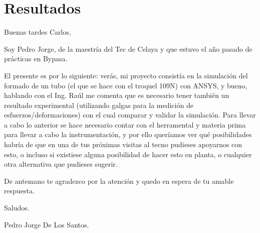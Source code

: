 \chapter{Resultados}

Buenas tardes Carlos, 


Soy Pedro Jorge, de la maestría del Tec de Celaya y que estuvo el año pasado de prácticas en Bypasa. 

El presente es por lo siguiente: verás, mi proyecto consistía en la simulación del formado de un tubo (el que se hace con el troquel 109N) con ANSYS, y bueno, hablando con el Ing. Raúl me comenta que es necesario tener también un resultado experimental (utilizando galgas para la medición de esfuerzos/deformaciones) con el cual comparar y validar la simulación. Para llevar a cabo lo anterior se hace necesario contar con el herramental y materia prima para llevar a cabo la instrumentación, y por ello queríamos ver qué posibilidades habría de que en una de tus próximas visitas al tecno pudieses apoyarnos con esto, o incluso si existiese alguna posibilidad de hacer esto en planta, o cualquier otra alternativa que pudieses sugerir.

De antemano te agradezco por la atención y quedo en espera de tu amable respuesta.

Saludos.

Pedro Jorge De Los Santos.
